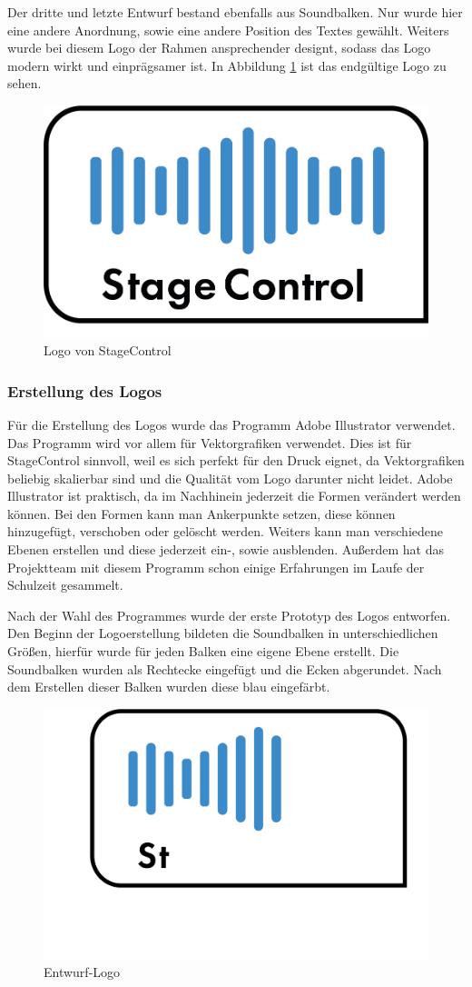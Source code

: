 Der dritte und letzte Entwurf bestand ebenfalls aus Soundbalken. Nur wurde hier eine andere Anordnung, sowie eine andere Position des Textes gewählt. Weiters wurde bei diesem Logo der Rahmen ansprechender designt, sodass das Logo modern wirkt und einprägsamer ist. In Abbildung \ref{fig:Logo StageControl} ist das endgültige Logo zu sehen.

\begin{figure}[H]
	\centering
	\includegraphics[width=0.5\linewidth]{images/Logo StageControl.png}
	\caption[Logo von StageControl]{Logo von StageControl}
	\label{fig:Logo StageControl}
\end{figure}

\newpage
\subsubsection{Erstellung des Logos}
Für die Erstellung des Logos wurde das Programm Adobe Illustrator verwendet. Das Programm wird vor allem für Vektorgrafiken verwendet. Dies ist für StageControl sinnvoll, weil es sich perfekt für den Druck eignet, da Vektorgrafiken beliebig skalierbar sind und die Qualität vom Logo darunter nicht leidet. Adobe Illustrator ist praktisch, da im Nachhinein jederzeit die Formen verändert werden können. Bei den Formen kann man Ankerpunkte setzen, diese können hinzugefügt, verschoben oder gelöscht werden. Weiters kann man verschiedene Ebenen erstellen und diese jederzeit ein-, sowie ausblenden. Außerdem hat das Projektteam mit diesem Programm schon einige Erfahrungen im Laufe der Schulzeit gesammelt. 

Nach der Wahl des Programmes wurde der erste Prototyp des Logos entworfen. Den Beginn der Logoerstellung bildeten die Soundbalken in unterschiedlichen Größen, hierfür wurde für jeden Balken eine eigene Ebene erstellt. Die Soundbalken wurden als Rechtecke eingefügt und die Ecken abgerundet. Nach dem Erstellen dieser Balken wurden diese blau eingefärbt. 

\begin{figure}[H]
	\centering
	\includegraphics[width=0.5\linewidth]{images/Logo-Entwurf2.png}
	\caption[Entwurf-Logo]{Entwurf-Logo}
	\label{fig:Entwurf-Logo}
\end{figure}

